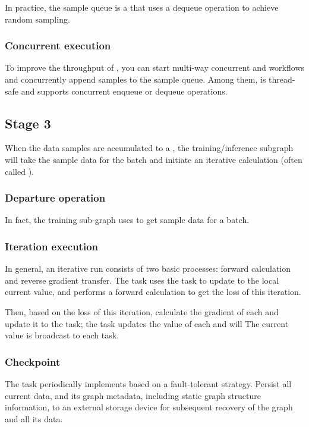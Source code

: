 \begin{content}
In practice, the sample queue is a  that uses a dequeue operation to achieve random sampling.


\subsubsection{Concurrent execution}
To improve the throughput of , you can start multi-way concurrent  and  workflows and concurrently append samples to the sample queue. Among them,  is thread-safe and supports concurrent enqueue or dequeue operations.


\subsection{Stage 3}
When the data samples are accumulated to a , the training/inference subgraph will take the sample data for the batch and initiate an iterative calculation (often called ).


\subsubsection{Departure operation}
In fact, the training sub-graph uses  to get sample data for a batch.


\subsubsection{Iteration execution}
In general, an iterative run consists of two basic processes: forward calculation and reverse gradient transfer. The  task uses the  task to update to the local current value, and performs a forward calculation to get the loss of this iteration.

Then, based on the loss of this iteration, calculate the gradient of each  and update it to the  task; the  task updates the value of each  and will The current value is broadcast to each  task.


\subsubsection{Checkpoint}
The  task periodically implements  based on a fault-tolerant strategy. Persist all current  data, and its graph metadata, including static graph structure information, to an external storage device for subsequent recovery of the graph and all its  data.



\end{content}

